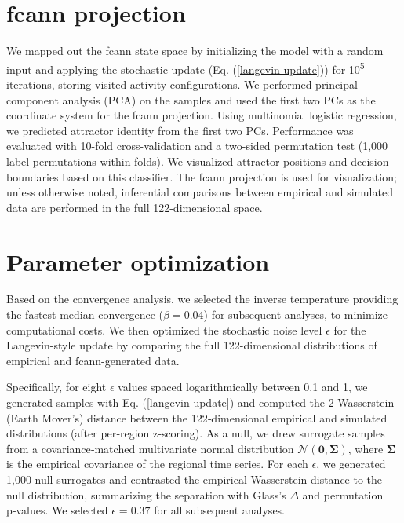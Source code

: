 \documentclass{article}
\begin{document}
\section{\acrshort{fcann} projection}

We mapped out the \acrshort{fcann} state space by initializing the model with a random input and applying the stochastic update (Eq. (\ref{langevin-update})) for 10\textsuperscript{5} iterations, storing visited activity configurations. We performed principal component analysis (PCA) on the samples and used the first two PCs as the coordinate system for the \acrshort{fcann} projection. Using multinomial logistic regression, we predicted attractor identity from the first two PCs. Performance was evaluated with 10-fold cross-validation and a two-sided permutation test (1,000 label permutations within folds). We visualized attractor positions and decision boundaries based on this classifier. The \acrshort{fcann} projection is used for visualization; unless otherwise noted, inferential comparisons between empirical and simulated data are performed in the full 122-dimensional space.

\section{Parameter optimization}

Based on the convergence analysis, we selected the inverse temperature providing the fastest median convergence ($\beta = 0.04$) for subsequent analyses, to minimize computational costs. We then optimized the stochastic noise level $\epsilon$ for the Langevin-style update by comparing the full 122-dimensional distributions of empirical and \acrshort{fcann}-generated data.

Specifically, for eight $\epsilon$ values spaced logarithmically between 0.1 and 1, we generated samples with Eq. (\ref{langevin-update}) and computed the 2‑Wasserstein (Earth Mover's) distance between the 122‑dimensional empirical and simulated distributions (after per‑region z‑scoring). As a null, we drew surrogate samples from a covariance‑matched multivariate normal distribution $\mathcal{N}(\boldsymbol{0}, \boldsymbol{\Sigma})$, where $\boldsymbol{\Sigma}$ is the empirical covariance of the regional time series. For each $\epsilon$, we generated 1,000 null surrogates and contrasted the empirical Wasserstein distance to the null distribution, summarizing the separation with Glass's $\Delta$ and permutation p‑values. We selected $\epsilon = 0.37$ for all subsequent analyses.
\end{document}
